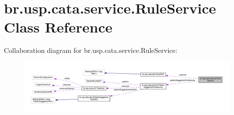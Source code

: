 \hypertarget{classbr_1_1usp_1_1cata_1_1service_1_1_rule_service}{\section{br.\+usp.\+cata.\+service.\+Rule\+Service Class Reference}
\label{classbr_1_1usp_1_1cata_1_1service_1_1_rule_service}
}


Collaboration diagram for br.\+usp.\+cata.\+service.\+Rule\+Service\+:\nopagebreak
\begin{figure}[H]
\begin{center}
\leavevmode
\includegraphics[width=350pt]{classbr_1_1usp_1_1cata_1_1service_1_1_rule_service__coll__graph}
\end{center}
\end{figure}
